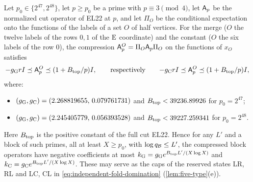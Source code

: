 \begin{proposition}\label{prop:observed-caps}
Let $p_0\in\{2^{47},2^{48}\}$, let $p\ge p_0$ be a prime with $p\equiv3\pmod4$, let
$\mathsf A_p$ be the normalized cut operator of EL22 at $p$, and let $\Pi_O$ be the
conditional expectation onto the functions of the labels of a set $O$ of half
vertices. For the merge ($O$ the twelve labels of the rows $0,1$ of the $\rm E$
coordinate) and the constant ($O$ the six labels of the row $0$), the compression
$\mathsf A_p^O=\Pi_O\mathsf A_p\Pi_O$ on the functions of $x_O$ satisfies
\[
 -g_{\rm G}rI\preceq\mathsf A_p^O\preceq(1+B_{\rm top}/p)I,\qquad\text{respectively}\qquad
 {-g_{\rm C}rI}\preceq\mathsf A_p^O\preceq(1+B_{\rm top}/p)I,
\]
where:
\begin{itemize}
\item $(g_{\rm G},g_{\rm C})=(2.268819655,\,0.079761731)$ and
 $B_{\rm top}<39236.89926$ for $p_0=2^{47}$;
\item $(g_{\rm G},g_{\rm C})=(2.245405779,\,0.056393528)$ and
 $B_{\rm top}<39227.259341$ for $p_0=2^{48}$.
\end{itemize}
Here $B_{\rm top}$ is the positive constant of the full cut EL22. Hence for any $L'$ and a block
of such primes, all at least $X\ge p_0$, with $\log q_\mathcal B\le L'$, the compressed
block operators have negative coefficients at most
$k_{\rm G}=g_{\rm G}e^{B_{\rm top}L'/(X\log X)}$ and
$k_{\rm C}=g_{\rm C}e^{B_{\rm top}L'/(X\log X)}$. These may serve as the caps of the
reserved states LR, RL and LC, CL in \eqref{eq:independent-fold-domination}
(\cref{lem:five-type}(e)).
\end{proposition}


